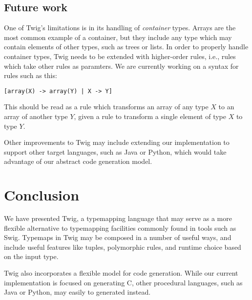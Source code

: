 
\subsection{Future work}

One of Twig's limitations is in its handling of \emph{container} types. Arrays are the most common example of a container, but they include any type which may contain elements of other types, such as trees or lists. In order to properly handle container types, Twig needs to be extended with higher-order rules, i.e., rules which take other rules as paramters. We are currently working on a syntax for rules such as this:

\begin{verbatim}
[array(X) -> array(Y) | X -> Y]
\end{verbatim}

This should be read as a rule which transforms an array of any type $X$ to an array of another type $Y$, given a rule to transform a single element of type $X$ to type $Y$.

Other improvements to Twig may include extending our implementation to support other target languages, such as Java or Python, which would take advantage of our abstract code generation model.

\section{Conclusion}

We have presented Twig, a typemapping language that may serve as a more flexible alternative to typemapping facilities commonly found in tools such as Swig. Typemaps in Twig may be composed in a number of useful ways, and include useful features like tuples, polymorphic rules, and runtime choice based on the input type.

Twig also incorporates a flexible model for code generation. While our current implementation is focused on generating C, other procedural languages, such as Java or Python, may easily to generated instead.
